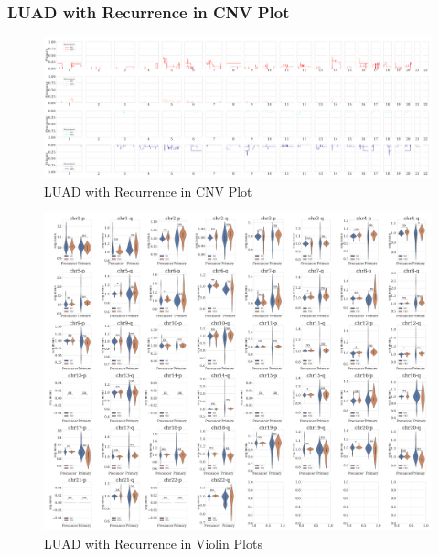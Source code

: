 \documentclass{beamer}
\begin{document}
    \begin{frame}[allowframebreaks]
        \frametitle{LUAD with Recurrence in CNV Plot}

        \begin{figure}
            \includegraphics[width=\linewidth]{figures/PureCN/BWA-simple-ADC.Recurrence.pdf}
            \caption{LUAD with Recurrence in CNV Plot}
        \end{figure}

        \begin{figure}
            \includegraphics[width=0.7 \linewidth]{figures/PureCN/BWA-violin-ADC.Recurrence.pdf}
            \caption{LUAD with Recurrence in Violin Plots}
        \end{figure}
    \end{frame}
\end{document}
